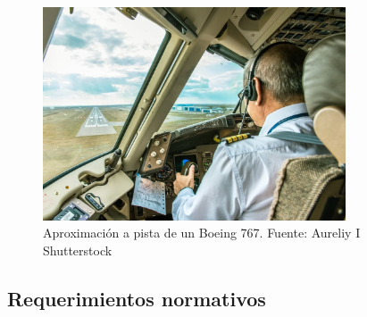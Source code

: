 \begin{figure}[!h]
  \centering
  \includegraphics[width = 0.8\textwidth]{06.radionavegacion/Imagenes/06.Sistemas.Aproximacion/shutterstock_592939535.jpg}
  \caption{Aproximación a pista de un Boeing 767. Fuente: Aureliy I Shutterstock }
  \label{fig:06.sistemas.aproximacion.pista}
\end{figure}



\subsection{Requerimientos normativos}
\label{sec:06.requerimientos.normativos.aproximacion}


